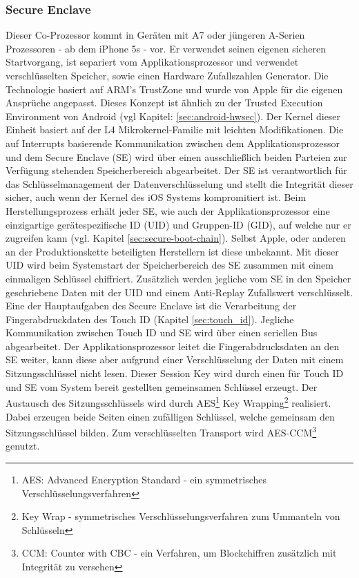 	\subsubsection{Secure Enclave}\label{sec:secure_enclave}
		Dieser Co-Prozessor kommt in Geräten mit A7 oder jüngeren A-Serien
		Prozessoren - ab dem iPhone 5s - vor. Er verwendet seinen eigenen
		sicheren Startvorgang, ist separiert vom Applikationsprozessor und verwendet
		verschlüsselten Speicher, sowie einen Hardware Zufallszahlen Generator. Die
		Technologie basiert auf ARM's TrustZone \cite{TrustZone2015} und wurde von
		Apple für die eigenen Ansprüche angepasst. Dieses Konzept ist ähnlich zu der
		Trusted Execution Environment von Android (vgl Kapitel:
		\ref{sec:android-hwsec}). Der Kernel dieser Einheit basiert auf der L4
		Mikrokernel-Familie \cite{L4MicroKernel2015} mit leichten Modifikationen. Die
		auf Interrupts basierende Kommunikation zwischen dem Applikationsprozessor
		und dem Secure Enclave (SE) wird über einen ausschließlich beiden Parteien zur
		Verfügung stehenden Speicherbereich abgearbeitet. Der SE ist verantwortlich für
		das Schlüsselmanagement der Datenverschlüsselung und stellt die Integrität
		dieser sicher, auch wenn der Kernel des iOS Systems kompromitiert ist. Beim
		Herstellungsprozess erhält jeder SE, wie auch der Applikationsprozessor eine
		einzigartige gerätespezifische ID (UID) und Gruppen-ID (GID), auf welche nur
		er zugreifen kann (vgl. Kapitel \ref{sec:secure-boot-chain}).
		Selbst Apple, oder anderen an der Produktionskette beteiligten Herstellern
		ist diese unbekannt. Mit dieser UID wird beim
		Systemstart der Speicherbereich des SE zusammen mit einem einmaligen
		Schlüssel chiffriert.
		Zusätzlich werden jegliche vom SE in den Speicher geschriebene Daten mit der
		UID und einem Anti-Replay Zufallswert verschlüsselt. Eine der Hauptaufgaben
		des Secure Enclave ist die Verarbeitung der Fingerabdruckdaten des Touch ID
		(Kapitel \ref{sec:touch_id}).
		Jegliche Kommunikation zwischen Touch ID und SE wird über einen seriellen Bus
		abgearbeitet. Der Applikationsprozessor leitet die Fingerabdrucksdaten an den
		SE weiter, kann diese aber aufgrund einer Verschlüsselung der Daten mit einem
		Sitzungsschlüssel nicht lesen. Dieser Session Key wird durch einen für Touch
		ID und SE vom System bereit gestellten gemeinsamen Schlüssel erzeugt. Der
		Austausch des Sitzungsschlüssels wird durch AES\footnote{AES: Advanced
		Encryption Standard - ein symmetrisches Verschlüsselungsverfahren} Key
		Wrapping\footnote{Key Wrap - symmetrisches Verschlüsselungsverfahren zum
		Ummanteln von Schlüsseln} realisiert. Dabei erzeugen beide Seiten einen
		zufälligen Schlüssel, welche gemeinsam den Sitzungsschlüssel bilden. Zum
		verschlüsselten Transport wird AES-CCM\footnote{CCM: Counter with CBC - ein
		Verfahren, um Blockchiffren zusätzlich mit Integrität zu versehen} genutzt.
		
